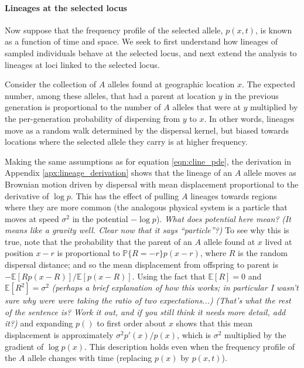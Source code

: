 \documentclass[11pt,letterpaper]{article}
\newcommand{\alisa}[1]{{\em \color{red} #1}}
\newcommand{\plr}[1]{{\em \color{blue} #1}}
\newcommand{\E}{\mathbb{E}}
\renewcommand{\P}{\mathbb{P}}
\newcommand{\grad}{\nabla}
\begin{document}
\paragraph{Lineages at the selected locus}
Now suppose that the frequency profile of the selected allele, $p(x,t)$, is known as a function of time and space.
We seek to first understand how lineages of sampled individuals behave at the selected locus,
and next extend the analysis to lineages at loci linked to the selected locus. 

Consider the collection of $A$ alleles found at geographic location $x$.
The expected number, among these alleles, that had a parent at location $y$ in the previous generation 
is proportional to the number of $A$ alleles that were at $y$ multiplied by the per-generation probability of dispersing from $y$ to $x$. 
In other words, lineages move as a random walk determined by the dispersal kernel,
but biased towards locations where the selected allele they carry is at higher frequency.

Making the same assumptions as for equation \eqref{eqn:cline_pde}, the derivation in Appendix \ref{apx:lineage_derivation} shows 
that the lineage of an $A$ allele moves as Brownian motion driven by dispersal
with mean displacement proportional to the derivative of $\log p$.
This has the effect of pulling $A$ lineages towards regions where they are more common
(the analogous physical system is a particle that moves at speed $\sigma^2$ in the potential $-\log p$). 
\alisa{What does potential here mean?}
\plr{(It means like a gravity well.  Clear now that it says ``particle''?)}
To see why this is true, note that the probability that the parent of an $A$ allele found at $x$
lived at position $x-r$ is proportional to $\P\{R=-r\} p(x-r)$, where $R$ is the random dispersal distance;
and so the mean displacement from offspring to parent is $-\E[R p(x-R)]/\E[p(x-R)]$.  
Using the fact that $\E[R]=0$ and $\E[R^2]=\sigma^2$ 
\alisa{(perhaps a brief explanation of how this works; in particular I wasn't sure why were were taking the ratio of two expectations...)}
\plr{(That's what the rest of the sentence is? Work it out, and if you still think it needs more detail, add it?)}
and expanding $p()$ to first order about $x$ shows that this mean displacement is approximately $\sigma^2 p'(x)/p(x)$,
which is $\sigma^2$ multiplied by the gradient of $\log p(x)$.
This description holds even when the frequency profile of the $A$ allele changes with time (replacing $p(x)$ by $p(x,t)$).
\end{document}
